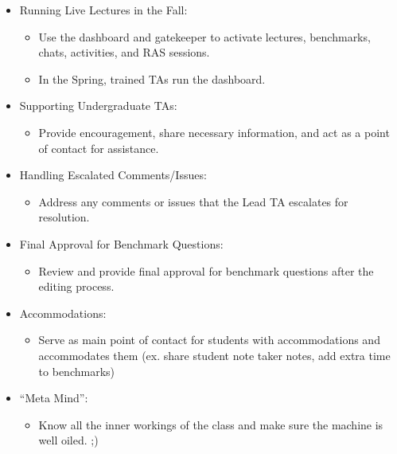 \documentclass[
]{article}
\providecommand{\tightlist}{%
  \setlength{\itemsep}{0pt}\setlength{\parskip}{0pt}}
\begin{document}
\begin{itemize}
\tightlist
\item
  Running Live Lectures in the Fall:

  \begin{itemize}
  \tightlist
  \item
    Use the dashboard and gatekeeper to activate lectures, benchmarks, chats, activities, and RAS sessions.
  \item
    In the Spring, trained TAs run the dashboard.
  \end{itemize}
\item
  Supporting Undergraduate TAs:

  \begin{itemize}
  \tightlist
  \item
    Provide encouragement, share necessary information, and act as a point of contact for assistance.
  \end{itemize}
\item
  Handling Escalated Comments/Issues:

  \begin{itemize}
  \tightlist
  \item
    Address any comments or issues that the Lead TA escalates for resolution.
  \end{itemize}
\item
  Final Approval for Benchmark Questions:

  \begin{itemize}
  \tightlist
  \item
    Review and provide final approval for benchmark questions after the editing process.
  \end{itemize}
\item
  Accommodations:

  \begin{itemize}
  \tightlist
  \item
    Serve as main point of contact for students with accommodations and accommodates them (ex. share student note taker notes, add extra time to benchmarks)
  \end{itemize}
\item
  ``Meta Mind'':

  \begin{itemize}
  \tightlist
  \item
    Know all the inner workings of the class and make sure the machine is well oiled. ;)
  \end{itemize}
\end{itemize}
\end{document}
